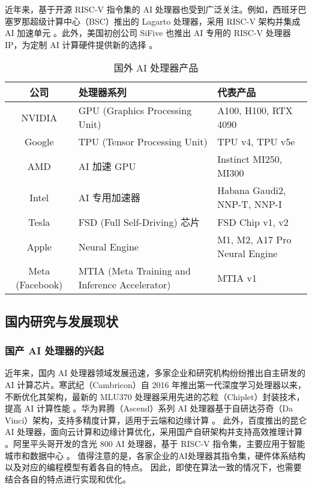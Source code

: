 近年来，基于开源 RISC-V 指令集的 AI 处理器也受到广泛关注。例如，西班牙巴塞罗那超级计算中心（BSC）推出的 Lagarto 处理器，采用 RISC-V 架构并集成 AI 加速单元 \cite{aschermann2021risc}。此外，美国初创公司 SiFive 也推出 AI 专用的 RISC-V 处理器 IP，为定制 AI 计算硬件提供新的选择 \cite{sifive2021ai}。
\begin{table}
    \centering
    \caption{国外 AI 处理器产品}
    \label{tab:ai_chips}
    \begin{tabular}{cll} %
      \toprule
      公司   & 处理器系列                                       & 代表产品                          \\
      \midrule
      {NVIDIA} & GPU (Graphics Processing Unit) & A100, H100, RTX 4090 \\ 
      {Google} & TPU (Tensor Processing Unit) & TPU v4, TPU v5e \\ 
      {AMD} & AI 加速 GPU & Instinct MI250, MI300 \\ 
      {Intel} & AI 专用加速器 & Habana Gaudi2, NNP-T, NNP-I \\ 
      {Tesla} & FSD (Full Self-Driving) 芯片 & FSD Chip v1, v2 \\ 
      {Apple} & Neural Engine & M1, M2, A17 Pro Neural Engine \\ 
      {Meta (Facebook)} & MTIA (Meta Training and Inference Accelerator) & MTIA v1 \\
  
      \bottomrule
    \end{tabular}
\end{table}


\subsection{国内研究与发展现状}

\subsubsection{国产 AI 处理器的兴起}

近年来，国内 AI 处理器领域发展迅速，多家企业和研究机构纷纷推出自主研发的 AI 计算芯片。寒武纪（Cambricon）自 2016 年推出第一代深度学习处理器以来，不断优化其架构，最新的 MLU370 处理器采用先进的芯粒（Chiplet）封装技术，提高 AI 计算性能 \cite{cambricon2022mlu}。华为昇腾（Ascend）系列 AI 处理器基于自研达芬奇（Da Vinci）架构，支持多精度计算，适用于云端和边缘计算 \cite{huawei2021ascend}。
此外，百度推出的昆仑 AI 处理器，面向云计算和边缘计算优化，采用国产自研架构并支持高效推理计算 \cite{baidu2021kunlun}。阿里平头哥开发的含光 800 AI 处理器，基于 RISC-V 指令集，主要应用于智能城市和数据中心 \cite{alibaba2019hanguang}。
值得注意的是，各家企业的AI处理器其指令集，硬件体系结构以及对应的编程模型有着各自的特点。
因此，即使在算法一致的情况下，也需要结合各自的特点进行实现和优化。

